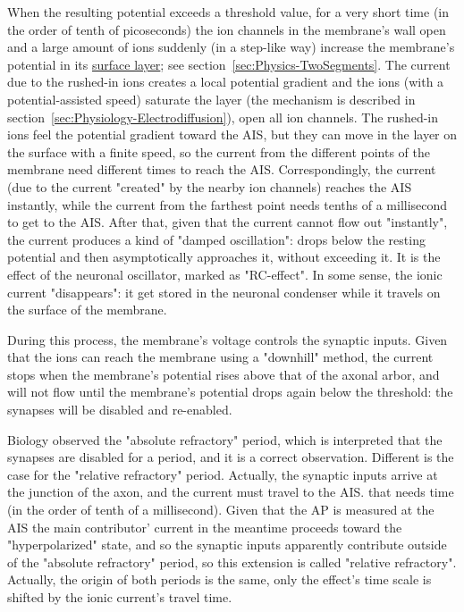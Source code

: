  When the resulting potential exceeds a threshold value, for a very short time
 (in the order of tenth of picoseconds) the ion channels in the membrane's wall open
 and a large amount of ions suddenly (in a step-like way) increase the membrane's potential
 in its \hyperlink{atomic_layer}
 {surface layer}; see section~\ref{sec:Physics-TwoSegments}.
The current due to the rushed-in ions creates a local potential gradient and the ions
(with a potential-assisted speed) saturate the layer
(the mechanism is described in section~\ref{sec:Physiology-Electrodiffusion}),
open all ion channels. The rushed-in ions feel the potential gradient toward the \gls{AIS},
but they can move in the layer on the surface
with a finite speed, so the current from the different points of the membrane need different times to reach the \gls{AIS}.
Correspondingly, the current (due to the current "created" by the nearby ion channels) reaches the \gls{AIS}
instantly, while the current from the farthest point needs tenths of a millisecond to get to the \gls{AIS}.
%
After that, given that the current cannot flow out "instantly",
the current produces a kind of "damped oscillation": drops below 
the resting potential and then asymptotically approaches it, without exceeding it.
It is the effect of the neuronal oscillator, marked as "RC-effect".
In some sense, the ionic current "disappears": it get stored in the neuronal condenser
while it travels on the surface of the membrane.

During this process, the membrane's voltage controls the synaptic inputs.
Given that the ions can reach the membrane using a "downhill" method,
the current stops  when the membrane's potential rises
above that of the axonal arbor,
and will not flow until the membrane's potential drops again below the threshold:
the synapses will be disabled and re-enabled.

Biology observed the "absolute refractory" period, which is interpreted 
that the synapses are disabled for a period, and it is a correct observation.
Different is the case for the "relative refractory" period.
Actually, the synaptic inputs arrive at the junction of the axon, and the current must travel to the \gls{AIS}.
that needs time (in the order of tenth of a millisecond). Given that 
the \gls{AP} is measured at the \gls{AIS}
the main contributor' current in the meantime proceeds toward the "hyperpolarized" state,
and so the synaptic inputs apparently contribute
outside of the "absolute refractory" period,
so this extension is called "relative refractory".
Actually, the origin of both periods is the same,
only the effect's time scale is shifted by the ionic current's travel time.

